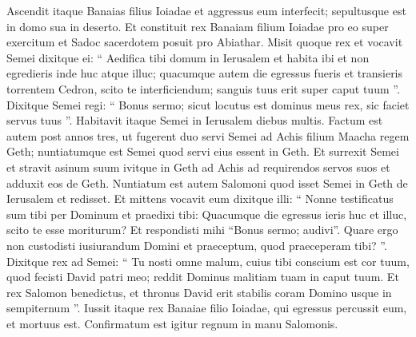 \begin{biblechapter}
\begin{biblechapter}
 \verse Ascendit itaque Banaias filius Ioiadae et aggressus eum interfecit; sepultusque est in domo sua in deserto. 
\verse Et constituit rex Banaiam filium Ioiadae pro eo super exercitum et Sadoc sacerdotem posuit pro Abiathar.
 \verse Misit quoque rex et vocavit Semei dixitque ei: “ Aedifica tibi domum in Ierusalem et habita ibi et non egredieris inde huc atque illuc; 
\verse quacumque autem die egressus fueris et transieris torrentem Cedron, scito te interficiendum; sanguis tuus erit super caput tuum ”. 
\verse Dixitque Semei regi: “ Bonus sermo; sicut locutus est dominus meus rex, sic faciet servus tuus ”. Habitavit itaque Semei in Ierusalem diebus multis.
 \verse Factum est autem post annos tres, ut fugerent duo servi Semei ad Achis filium Maacha regem Geth; nuntiatumque est Semei quod servi eius essent in Geth. 
\verse Et surrexit Semei et stravit asinum suum ivitque in Geth ad Achis ad requirendos servos suos et adduxit eos de Geth.
 \verse Nuntiatum est autem Salomoni quod isset Semei in Geth de Ierusalem et redisset. 
\verse Et mittens vocavit eum dixitque illi: “ Nonne testificatus sum tibi per Dominum et praedixi tibi: Quacumque die egressus ieris huc et illuc, scito te esse moriturum? Et respondisti mihi “Bonus sermo; audivi”. 
\verse Quare ergo non custodisti iusiurandum Domini et praeceptum, quod praeceperam tibi? ”. 
\verse Dixitque rex ad Semei: “ Tu nosti omne malum, cuius tibi conscium est cor tuum, quod fecisti David patri meo; reddit Dominus malitiam tuam in caput tuum. 
\verse Et rex Salomon benedictus, et thronus David erit stabilis coram Domino usque in sempiternum ”. 
\verse Iussit itaque rex Banaiae filio Ioiadae, qui egressus percussit eum, et mortuus est. Confirmatum est igitur regnum in manu Salomonis.
 

\end{biblechapter}
\end{biblechapter}
